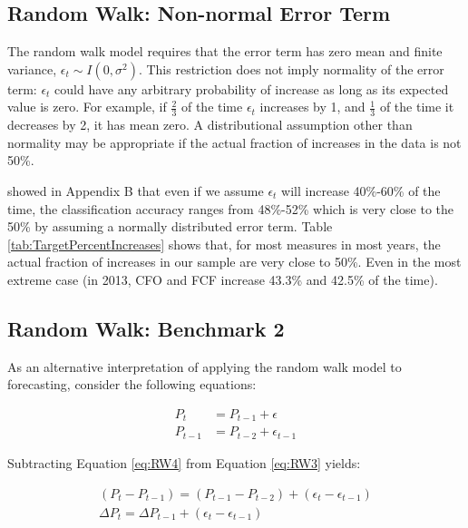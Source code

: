 \subsection{Random Walk: Non-normal Error Term}

The random walk model requires that the error term has zero mean and finite variance, \(\epsilon_t \sim I(0,\sigma^2)\). This restriction does not imply normality of the error term: \(\epsilon_t\) could have any arbitrary probability of increase as long as its expected value is zero.  For example,  if \(\frac{2}{3}\) of the time \(\epsilon_t\) increases by 1, and \(\frac{1}{3}\) of the time it decreases by 2,  it has mean zero.  A distributional assumption other than normality may be appropriate if the actual fraction of increases in the data is not 50\%.

\cite{ABIS} showed in Appendix B  that even if we assume \(\epsilon_t\) will increase 40\%-60\% of the time, the classification accuracy ranges from 48\%-52\% which is very close to the 50\% by assuming a normally distributed error term. Table \ref{tab:TargetPercentIncreases} shows that,  for most measures in most years, the actual fraction of increases in our sample are very close to 50\%. Even in the most extreme case (in 2013,  CFO and FCF increase 43.3\% and 42.5\% of the time).

\subsection{Random Walk: Benchmark 2}

As an alternative interpretation of applying the random walk model to forecasting, consider the following equations:

\begin{align}
	P_t &= P_{t-1} + \epsilon \label{eq:RW3}\\
	P_{t-1} &= P_{t-2} + \epsilon_{t-1} \label{eq:RW4}
\end{align}

\noindent Subtracting Equation \ref{eq:RW4} from Equation \ref{eq:RW3} yields:

\begin{align}
(P_t - P_{t-1}) = (P_{t-1} - P_{t-2}) + (\epsilon_t - \epsilon_{t-1}) \nonumber \\
\Delta P_t = \Delta P_{t-1} + (\epsilon_t - \epsilon_{t-1}) \label{eq:RW5}
\end{align}

